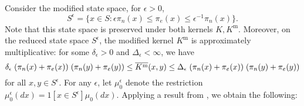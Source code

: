 Consider the modified state space, for $\epsilon>0$, \begin{equation*}
    S^\epsilon= \{x\in S: \epsilon \pi_n(x) \leq \pi_e(x) \leq \epsilon^{-1} \pi_n(x)\}.
\end{equation*} Note that this state space is preserved under both kernels $K, K^\text{m}$. Moreover, on the reduced state space $S^\epsilon$, the modified kernel $K^\text{m}$ is approximately multiplicative: for some $\delta_\epsilon>0$ and $\Delta_\epsilon<\infty$, we have \begin{equation*}
    \delta_\epsilon\hspace{0.1cm} (\pi_n(x)+\pi_e(x))\hspace{0.1cm}(\pi_n(y)+\pi_e(y)) \leq \overline{K^\text{m}}(x,y) \leq  \Delta_\epsilon\hspace{0.1cm} (\pi_n(x)+\pi_e(x))\hspace{0.1cm}(\pi_n(y)+\pi_e(y))
\end{equation*}for all $x,y \in S^\epsilon$. For any $\epsilon$, let $\mu_0^\epsilon$ denote the restriction $\mu_0^\epsilon(dx)=1[x\in S^\epsilon]\mu_0(dx).$ Applying a result from  \cite{N00}, we obtain the following:
